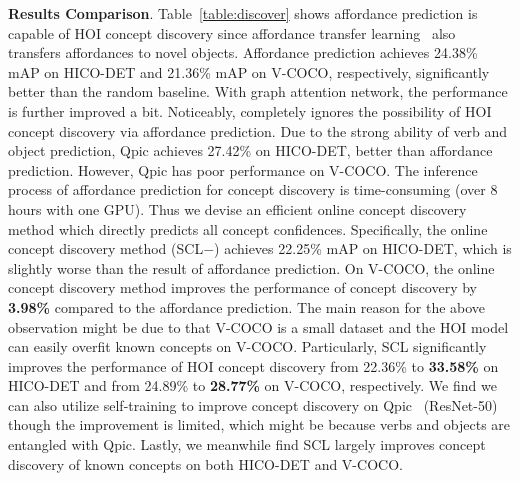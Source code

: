 \documentclass[runningheads]{llncs}
\begin{document}
{\bf Results Comparison}. Table~\ref{table:discover} shows affordance prediction is capable of HOI concept discovery since affordance transfer learning~\cite{hou2021atl} also transfers affordances to novel objects. Affordance prediction achieves 24.38\% mAP on HICO-DET and 21.36\% mAP on V-COCO, respectively, significantly better than the random baseline. With graph attention network, the performance is further improved a bit. Noticeably, \cite{hou2021atl} completely ignores the possibility of HOI concept discovery via affordance prediction. Due to the strong ability of verb and object prediction, Qpic achieves 27.42\% on HICO-DET, better than affordance prediction. However, Qpic has poor performance on V-COCO. The inference process of affordance prediction for concept discovery is time-consuming (over 8 hours with one GPU). Thus we devise an efficient online concept discovery method which directly predicts all concept confidences. Specifically, the online concept discovery method (SCL$-$) achieves 22.25\% mAP on HICO-DET, which is slightly worse than the result of affordance prediction. On V-COCO, the online concept discovery method improves the performance of concept discovery by {\bf 3.98\%} compared to the affordance prediction. The main reason for the above observation might be due to that V-COCO is a  small dataset and the HOI model can easily overfit known concepts on V-COCO.
Particularly, SCL significantly improves the performance of HOI concept discovery from 22.36\% to {\bf 33.58\%} on HICO-DET and from 24.89\% to {\bf 28.77\%} on V-COCO, respectively. We find we can also utilize self-training to improve concept discovery on Qpic~\cite{tamura_cvpr2021} (ResNet-50) though the improvement is limited, which might be because verbs and objects are entangled with Qpic. Lastly, we meanwhile find SCL largely improves concept discovery of known concepts on both HICO-DET and V-COCO.
\end{document}
